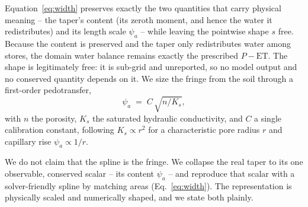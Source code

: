 Equation~\eqref{eq:width} preserves exactly the two quantities that carry physical meaning -- the
taper's content (its zeroth moment, and hence the water it redistributes) and its length scale
$\psi_a$ -- while leaving the pointwise shape $s$ free. Because the content is preserved and the
taper only redistributes water among stores, the domain water balance remains exactly the prescribed
$P-\mathrm{ET}$. The shape is legitimately free: it is sub-grid and unreported, so no model output
and no conserved quantity depends on it. We size the fringe from the soil through a first-order
pedotransfer,
\begin{equation}
\psi_a \;=\; C\,\sqrt{n/K_s},
\label{eq:pedo}
\end{equation}
with $n$ the porosity, $K_s$ the saturated hydraulic conductivity, and $C$ a single calibration
constant, following $K_s \propto r^{2}$ for a characteristic pore radius $r$ and capillary rise
$\psi_a \propto 1/r$.

We do not claim that the spline is the fringe. We collapse the real taper to its one observable,
conserved scalar -- its content $\psi_a$ -- and reproduce that scalar with a solver-friendly spline
by matching areas (Eq.~\ref{eq:width}). The representation is physically scaled and numerically
shaped, and we state both plainly.

